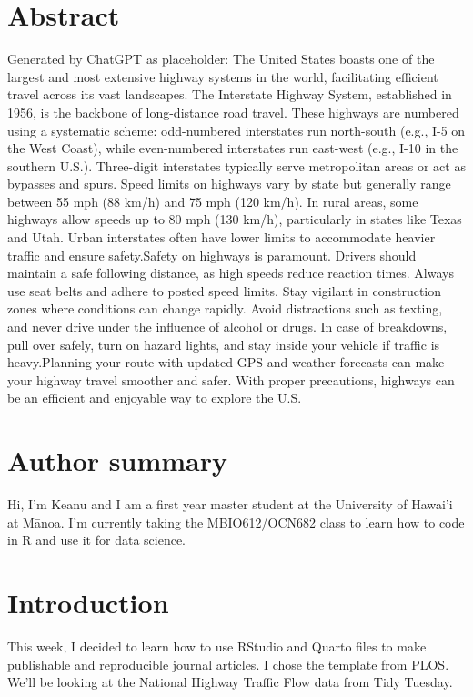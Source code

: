 \documentclass[
  10pt,
  letterpaper,
]{article}
\begin{document}
\section*{Abstract}
Generated by ChatGPT as placeholder: The United States boasts one of the
largest and most extensive highway systems in the world, facilitating
efficient travel across its vast landscapes. The Interstate Highway
System, established in 1956, is the backbone of long-distance road
travel. These highways are numbered using a systematic scheme:
odd-numbered interstates run north-south (e.g., I-5 on the West Coast),
while even-numbered interstates run east-west (e.g., I-10 in the
southern U.S.). Three-digit interstates typically serve metropolitan
areas or act as bypasses and spurs. Speed limits on highways vary by
state but generally range between 55 mph (88 km/h) and 75 mph (120
km/h). In rural areas, some highways allow speeds up to 80 mph (130
km/h), particularly in states like Texas and Utah. Urban interstates
often have lower limits to accommodate heavier traffic and ensure
safety.Safety on highways is paramount. Drivers should maintain a safe
following distance, as high speeds reduce reaction times. Always use
seat belts and adhere to posted speed limits. Stay vigilant in
construction zones where conditions can change rapidly. Avoid
distractions such as texting, and never drive under the influence of
alcohol or drugs. In case of breakdowns, pull over safely, turn on
hazard lights, and stay inside your vehicle if traffic is heavy.Planning
your route with updated GPS and weather forecasts can make your highway
travel smoother and safer. With proper precautions, highways can be an
efficient and enjoyable way to explore the U.S.

\section*{Author summary}
Hi, I'm Keanu and I am a first year master student at the University of
Hawai'i at Mānoa. I'm currently taking the MBIO612/OCN682 class to learn
how to code in R and use it for data science.

\linenumbers

\section{Introduction}\label{introduction}

This week, I decided to learn how to use RStudio and Quarto files to
make publishable and reproducible journal articles. I chose the template
from PLOS.\\
We'll be looking at the National Highway Traffic Flow data from Tidy
Tuesday.
\end{document}
